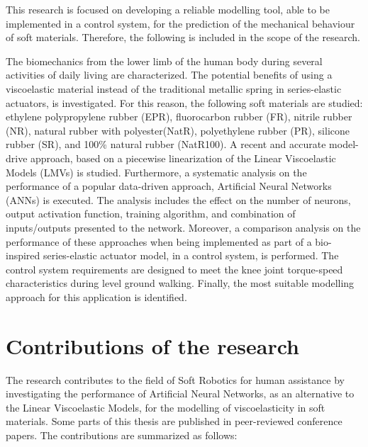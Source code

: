 This research is focused on developing a reliable modelling tool, able to be implemented in a control system, for the prediction of the mechanical behaviour of soft materials. Therefore, the following is included in the scope of the research. 

The biomechanics from the lower limb of the human body during several activities of daily living are characterized. The potential benefits of using a viscoelastic material instead of the traditional metallic spring in series-elastic actuators, is investigated. For this reason, the following soft materials are studied: ethylene polypropylene rubber (EPR), fluorocarbon rubber (FR), nitrile rubber (NR), natural rubber with polyester(NatR),  polyethylene  rubber  (PR),  silicone  rubber  (SR), and  100\% natural rubber (NatR100). A recent and accurate model-drive approach, based on a piecewise linearization of the Linear Viscoelastic Models (LMVs) is studied. Furthermore, a systematic analysis on the performance of a popular data-driven approach, Artificial Neural Networks (ANNs) is executed. The analysis includes the effect on the number of neurons, output activation function, training algorithm, and combination of inputs/outputs presented to the network. Moreover, a comparison analysis on the performance of these approaches when being implemented as part of a bio-inspired series-elastic actuator model, in a control system, is performed. The control system requirements are designed to meet the knee joint torque-speed characteristics during level ground walking. Finally, the most suitable modelling approach for this application is identified.

\section{Contributions of the research}

The research contributes to the field of Soft Robotics for human assistance by investigating the performance of Artificial Neural Networks, as an alternative to the Linear Viscoelastic Models, for the modelling of viscoelasticity in soft materials. Some parts of this thesis are published in peer-reviewed conference papers. The contributions are summarized as follows:

